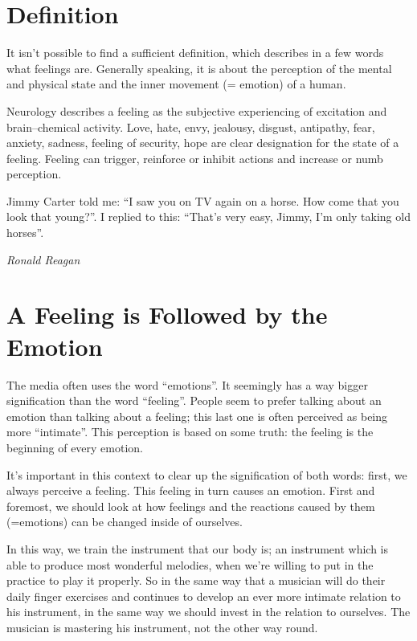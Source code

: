 \documentclass[../Book.Stress_regulation.tex]{subfiles}
\begin{document}
\section{Definition}

It isn't possible to find a sufficient definition, which describes in a few words what feelings are.
Generally speaking, it is about the perception of the mental and physical state and the inner movement (= emotion) of a human.

Neurology describes a feeling as the subjective experiencing of excitation and brain--chemical activity.
Love, hate, envy, jealousy, disgust, antipathy, fear, anxiety, sadness, feeling of security, hope are clear designation for the state of a feeling.
Feeling can trigger, reinforce or inhibit actions and increase or numb perception.

\epigraph{Jimmy Carter told me: ``I saw you on TV again on a horse. How come that you look that young?''. I replied to this: ``That's very easy, Jimmy, I'm only taking old horses''.}{\textit{Ronald Reagan}}

\section{A Feeling is Followed by the Emotion}

The media often uses the word ``emotions''.
It seemingly has a way bigger signification than the word ``feeling''.
People seem to prefer talking about an emotion than talking about a feeling; this last one is often perceived as being more ``intimate''.
This perception is based on some truth: the feeling is the beginning of every emotion.

It's important in this context to clear up the signification of both words: first, we always perceive a feeling.
This feeling in turn causes an emotion.
First and foremost, we should look at how feelings and the reactions caused by them (=emotions) can be changed inside of ourselves.

In this way, we train the instrument that our body is;
an instrument which is able to produce most wonderful melodies, when we're willing to put in the practice to play it properly.
So in the same way that a musician will do their daily finger exercises and continues to develop an ever more intimate relation to his instrument,
in the same way we should invest in the relation to ourselves.
The musician is mastering his instrument, not the other way round.
\end{document}
